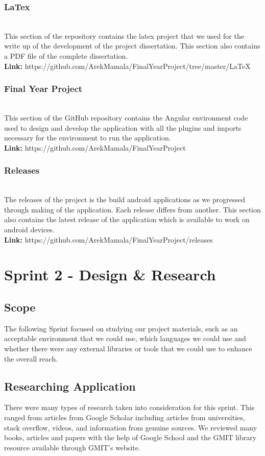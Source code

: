 \documentclass[a4paper,12pt]{report}
\begin{document}
\subsubsection{LaTex}\\
This section of the repository contains the latex project that we used for the write up of the development of the project dissertation. This section also contains a PDF file of the complete dissertation.\\  
\textbf{Link:} https://github.com/ArekMamala/FinalYearProject/tree/master/LaTeX

\subsubsection{Final Year Project}\\
This section of the GitHub repository contains the Angular environment code used to design and develop the application with all the plugins and imports necessary for the environment to run the application.\\
\textbf{Link:} https://github.com/ArekMamala/FinalYearProject

\subsubsection{Releases}\\
The releases of the project is the build android applications as we progressed through making of the application. Each release differs from another. This section also contains the latest release of the application which is available to work on android devices.\\
\textbf{Link:} https://github.com/ArekMamala/FinalYearProject/releases


\section{Sprint 2 - Design & Research}
\subsection{Scope}
The following Sprint focused on studying our project materials, such as an acceptable environment that we could use, which languages we could use and whether there were any external libraries or tools that we could use to enhance the overall reach.

\subsection{Researching Application}
There were many types of research taken into consideration for this sprint. This ranged from articles from Google Scholar including articles from universities, stack overflow, videos, and information from genuine sources. We reviewed many books, articles and papers with the help of Google School and the GMIT library resource available through GMIT's website.
\end{document}
